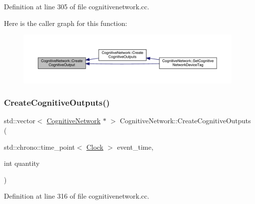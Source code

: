 Definition at line 305 of file cognitivenetwork.\+cc.

Here is the caller graph for this function\+:
\nopagebreak
\begin{figure}[H]
\begin{center}
\leavevmode
\includegraphics[width=350pt]{class_cognitive_network_ac220350499bd323bd8f24ff0050cd60d_icgraph}
\end{center}
\end{figure}
\mbox{\label{class_cognitive_network_a002df11f4389a122fc140c186ab665c9}} 
\subsubsection{\texorpdfstring{Create\+Cognitive\+Outputs()}{CreateCognitiveOutputs()}}
{\footnotesize\ttfamily std\+::vector$<$ \hyperlink{class_cognitive_network}{Cognitive\+Network} $\ast$ $>$ Cognitive\+Network\+::\+Create\+Cognitive\+Outputs (\begin{DoxyParamCaption}\item[{std\+::chrono\+::time\+\_\+point$<$ \hyperlink{universe_8h_a0ef8d951d1ca5ab3cfaf7ab4c7a6fd80}{Clock} $>$}]{event\+\_\+time,  }\item[{int}]{quantity }\end{DoxyParamCaption})}



Definition at line 316 of file cognitivenetwork.\+cc.

